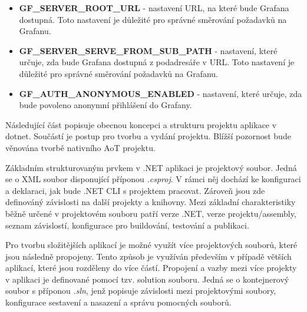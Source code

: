 \begin{itemize}
    \item \textbf{GF\_SERVER\_ROOT\_URL} - nastavení URL, na které bude Grafana dostupná. Toto nastavení je důležité pro správné směrování požadavků na Grafanu.
    \item \textbf{GF\_SERVER\_SERVE\_FROM\_SUB\_PATH} - nastavení, které určuje, zda bude Grafana dostupná z podadresáře v URL. Toto nastavení je důležité pro správné směrování požadavků na Grafanu.
    \item \textbf{GF\_AUTH\_ANONYMOUS\_ENABLED} - nastavení, které určuje, zda bude povoleno anonymní přihlášení do Grafany.
\end{itemize}









Následující část popisuje obecnou koncepci a strukturu projektu aplikace v dotnet. Součástí je postup pro tvorbu a vydání projektu. Blížší pozornost bude věnována tvorbě nativního AoT projektu.


Základním strukturovaným prvkem v .NET aplikaci je projektový soubor. Jedná se o XML soubor disponující příponou \emph{.csproj}. V rámci něj dochází ke konfiguraci a deklaraci, jak bude .NET CLI s projektem pracovat. Zároveň jsou zde definováný závislosti na další projekty a knihovny. Mezi základní charakteristiky běžně určené v projektovém souboru patří verze .NET, verze projektu/assembly, seznam závislostí, konfigurace pro buildování, testování a publikaci.

Pro tvorbu složitějších aplikací je možné využít více projektových souborů, které jsou následně propojeny. Tento způsob je využíván především v případě větších aplikací, které jsou rozděleny do více částí. Propojení a vazby mezi více projekty v aplikaci je definované pomocí tzv. solution souboru. Jedná se o kontejnerový soubor s příponou \emph{.sln}, jenž popisuje závislosti mezi projektovými soubory, konfigurace sestavení a nasazení a správu pomocných souborů.


